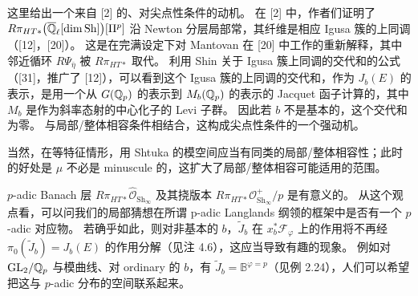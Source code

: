 \begin{remark}[尖点性条件的动机]
这里给出一个来自 [2] 的、对尖点性条件的动机。
在 [2] 中，作者们证明了 $R\pi_{HT*}\bigl(\overline{\mathbb{Q}}_\ell[\dim\mathrm{Sh}]\bigr)[\Pi^p]$ 沿 Newton 分层局部常，其纤维是相应 Igusa 簇的上同调（[12]，[20]）。
这是在完满设定下对 Mantovan 在 [20] 中工作的重新解释，其中邻近循环 $R\Psi_{\bar\eta}$ 被 $R\pi_{HT*}$ 取代。
利用 Shin 关于 Igusa 簇上同调的交代和的公式（[31]，推广了 [12]），可以看到这个 Igusa 簇的上同调的交代和，作为 $J_b(E)$ 的表示，是用一个从 $G(\mathbb{Q}_p)$ 的表示到 $M_b(\mathbb{Q}_p)$ 的表示的 Jacquet 函子计算的，其中 $M_b$ 是作为斜率态射的中心化子的 Levi 子群。
因此若 $b$ 不是基本的，这个交代和为零。
与局部/整体相容条件相结合，这构成尖点性条件的一个强动机。
\end{remark}

\begin{remark}[等特征情形]
当然，在等特征情形，用 Shtuka 的模空间应当有同类的局部/整体相容性；此时的好处是 $\mu$ 不必是 minuscule 的，这扩大了局部/整体相容可能适用的范围。
\end{remark}

\begin{remark}[$\ell=p$]
$p$-adic Banach 层 $R\pi_{HT*}\widehat{\mathcal{O}}_{\mathrm{Sh}_\infty}$ 及其挠版本 $R\pi_{HT*}\mathcal{O}^+_{\mathrm{Sh}_\infty}/p$ 是有意义的。
从这个观点看，可以问我们的局部猜想在所谓 p-adic Langlands 纲领的框架中是否有一个 $p$-adic 对应物。
若确乎如此，则对非基本的 $b$，$\widetilde{J}_b$ 在 $x_b^*\mathscr{F}_\varphi$ 上的作用将不再经 $\pi_0(\widetilde{J}_b)=J_b(E)$ 的作用分解（见注 4.6），这应当导致有趣的现象。
例如对 $\mathrm{GL}_2/\mathbb{Q}_p$ 与模曲线、对 ordinary 的 $b$，有 $\widetilde{J}_b=\mathbb{B}^{\varphi=p}$（见例 2.24），人们可以希望把这与 $p$-adic 分布的空间联系起来。
\end{remark}
